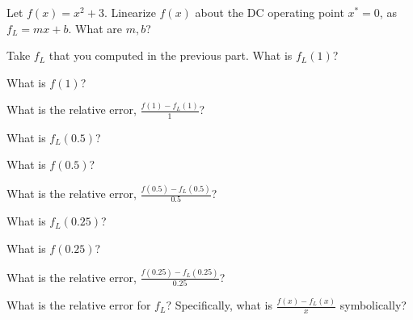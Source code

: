 

\begin{enumerate}

\qitem   Let $f(x) = x^2 + 3$. Linearize $f(x)$ about the DC operating point $x^* = 0$, as $f_L = mx + b$. What are $m, b$?



\qitem  Take $f_L$ that you computed in the previous part. What is $f_L(1)$?




\qitem What is $f(1)$?


\qitem What is the relative error, $\frac{f(1) - f_L(1)}{1}$?


\qitem What is $f_L(0.5)$?


\qitem What is $f(0.5)$?


\qitem What is the relative error, $\frac{f(0.5) - f_L(0.5)}{0.5}$?





\qitem What is $f_L(0.25)$?


\qitem What is $f(0.25)$?


\qitem What is the relative error, $\frac{f(0.25) - f_L(0.25)}{0.25}$?



\qitem What is the relative error for $f_L$? Specifically, what is $\frac{f(x) - f_L(x)}{x}$ symbolically?



\end{enumerate}